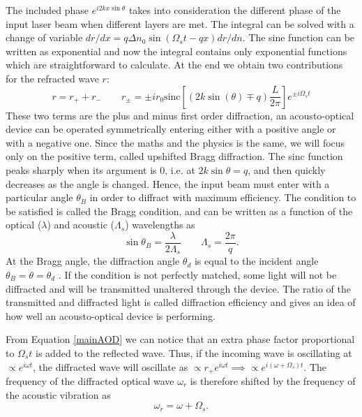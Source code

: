The included phase $e^{i2kx \sin\theta}$ takes into consideration the different phase of the input laser beam when different layers are met. The integral can be solved with a change of variable $dr/dx = q \Delta n_0 \sin \left(\Omega_s t - qx \right)dr/dn $. The sine function can be written as exponential and now the integral contains only exponential functions which are straightforward to calculate. At the end we obtain two contributions for the refracted wave $r$:
\begin{equation}
\label{mainAOD}
r = r_+ + r_- \qquad r_\pm = \pm i r_0 \text{sinc} \left[(2k\sin(\theta) \mp q)\frac{L}{2\pi} \right]e^{\pm i\Omega_s t}
\end{equation}
These two terms are the plus and minus first order diffraction, an acousto-optical device can be operated symmetrically entering either with a positive angle or with a negative one. Since the maths and the physics is the same, we will focus only on the positive term, called upshifted Bragg diffraction. The sinc function peaks sharply when its argument is 0, i.e. at $2k\sin\theta = q$, and then quickly decreases as the angle is changed. Hence, the input beam must enter with a particular angle $\theta_B$ in order to diffract with maximum efficiency. The condition to be satisfied is called the Bragg condition, and can be written as a function of the optical ($\lambda$) and acoustic ($\Lambda_s$) wavelengths as
\begin{equation}
\label{braggcondition}
\sin \theta_B  = \frac{\lambda}{2 \Lambda_s} \qquad \Lambda_s = \frac{2\pi}{q}.
\end{equation}
At the Bragg angle, the diffraction angle $\theta_d$ is equal to the incident angle $\theta_B = \theta = \theta_d$ \cite{Korpel1981}. If the condition is not perfectly matched, some light will not be diffracted and will be transmitted unaltered through the device. The ratio of the transmitted and diffracted light is called diffraction efficiency and gives an idea of how well an acousto-optical device is performing.\par
From Equation \eqref{mainAOD} we can notice that an extra phase factor proportional to $\Omega_s t$ is added to the reflected wave. Thus, if the incoming wave is oscillating at $\propto e^{i\omega t}$, the diffracted wave will oscillate as $\propto r_{+}e^{i\omega t} \implies \propto e^{i(\omega + \Omega_s )t}$. The frequency of the diffracted optical wave $\omega_r$ is therefore shifted by the frequency of the acoustic vibration as
\begin{equation}
\label{eq:aodshift}
\omega_r  =  \omega + \Omega_s.
\end{equation}
